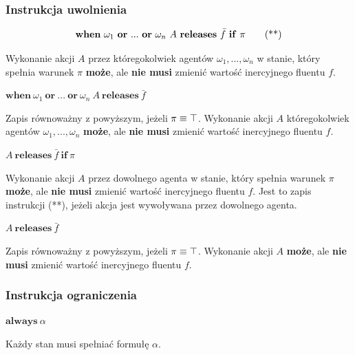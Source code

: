 \documentclass[11pt,a4paper]{article}
\def\tang{\ThisStyle{\abovebaseline[0pt]{\scalebox{-1}{$\SavedStyle\perp$}}}}
\begin{document}
    \subsubsection{Instrukcja uwolnienia}
    
    \begin{center}
    	\vspace{-8mm}
    	\begin{equation}
    	\vspace{-4mm}\mathbf{when}~\omega_1~\mathbf{or}~...~\mathbf{or}~\omega_n~A~\mathbf{releases}~\bar{f}~\mathbf{if}~\pi\tag{**}
    	\end{equation}
    \end{center}
    Wykonanie akcji $A$ przez któregokolwiek agentów $\omega_1, ..., \omega_n$ w stanie, który spełnia warunek $\pi$ \textbf{może}, ale \textbf{nie musi} zmienić wartość inercyjnego fluentu $f$.
    
    \begin{center}
        $\mathbf{when}~\omega_1~\mathbf{or}~...~\mathbf{or}~\omega_n~A~\mathbf{releases}~\bar{f}$
    \end{center}
    Zapis równoważny z powyższym, jeżeli $\pi \equiv \tang$. Wykonanie akcji $A$ któregokolwiek agentów $\omega_1, ..., \omega_n$ \textbf{może}, ale \textbf{nie musi} zmienić wartość inercyjnego fluentu $f$.
    
    \begin{center}
        $A~\mathbf{releases}~\bar{f}~\mathbf{if}~\pi$
    \end{center}
    Wykonanie akcji $A$ przez dowolnego agenta w stanie, który spełnia warunek $\pi$ \textbf{może}, ale \textbf{nie musi} zmienić wartość inercyjnego fluentu $f$. Jest to zapis instrukcji (**), jeżeli akcja jest wywoływana przez dowolnego agenta.
    
    \begin{center}
        $A~\mathbf{releases}~\bar{f}$
    \end{center}
    Zapis równoważny z powyższym, jeżeli $\pi \equiv \tang$. Wykonanie akcji $A$ \textbf{może}, ale \textbf{nie musi} zmienić wartość inercyjnego fluentu $f$.
    
    \subsubsection{Instrukcja ograniczenia}    
   
    \begin{center}
        $\mathbf{always}~\alpha$
    \end{center}
    Każdy stan musi spełniać formułę $\alpha$.
    
\end{document}

